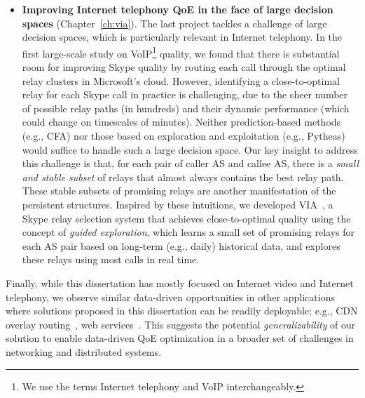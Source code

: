 \begin{itemize}
\item {\bf Improving Internet telephony QoE in the face of large decision spaces} 
(Chapter~\ref{ch:via}).
The last project tackles a challenge of large decision spaces, which 
is particularly relevant in Internet telephony.
In the first large-scale study on VoIP\footnote{We use the terms Internet telephony 
and VoIP interchangeably.} quality, we found that 
there is substantial room for improving Skype quality by routing each 
call through the optimal relay clusters in Microsoft's cloud.
However, identifying a close-to-optimal relay for each Skype call in practice 
is challenging, 
due to the sheer number of possible relay paths 
(in hundreds) and their dynamic performance (which could change 
on timescales of minutes). Neither prediction-based methods (e.g., 
CFA) nor those based on 
exploration and exploitation (e.g., Pytheas) would suffice to handle such a 
large decision space.
Our key insight to address this challenge is that, for each pair of caller 
AS and callee AS, there is a {\em small and stable subset} of relays that 
almost always contains the best relay path. These stable subsets of promising
relays are another manifestation of the persistent structures.
Inspired by these intuitions, we developed {VIA}~\cite{via}, 
a Skype relay selection system that achieves close-to-optimal quality 
using the concept of {\em guided exploration},
which learns a small set of promising relays for each 
AS pair based on long-term (e.g., daily) historical data, and 
explores these relays using most calls in real time.

\end{itemize}


%
Finally, while this dissertation has mostly focused on 
Internet video and Internet telephony, 
we observe similar data-driven opportunities in other applications
where solutions proposed in this dissertation can be readily 
deployable; e.g., CDN overlay routing~\cite{mukerjee2015practical}, 
web services~\cite{footprint}.
This suggests the potential {\em generalizability} of our solution to enable
data-driven QoE optimization in a broader set of challenges in 
networking and distributed systems.

